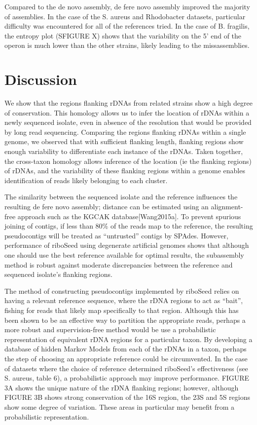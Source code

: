 \documentclass[11pt]{article}
\begin{document}
\begin{linenumbers}
Compared to the de novo assembly, de fere novo assembly improved the majority of assemblies. In the case of the S. aureus and Rhodobacter datasets, particular difficulty was encountered for all of the references tried. In the case of B. fragilis, the entropy plot (SFIGURE X) shows that the variability on the 5’ end of the operon is much lower than the other strains, likely leading to the missassemblies.


\section*{Discussion}
We show that the regions flanking rDNAs from related strains show a high degree of conservation. This homology allows us to infer the location of rDNAs within a newly sequenced isolate, even in absence of the resolution that would be provided by long read sequencing. Comparing the regions flanking rDNAs within a single genome, we observed that with sufficient flanking length, flanking regions show enough variability to differentiate each instance of the rDNAs. Taken together, the cross-taxon homology allows inference of the location (ie the flanking regions) of rDNAs, and the variability of these flanking regions within a genome enables identification of reads likely belonging to each cluster.


The similarity between the sequenced isolate and the reference influences the resulting de fere novo assembly; distance can be estimated using an alignment-free approach such as the KGCAK database[Wang2015a]. To prevent spurious joining of contigs, if less than 80\% of the reads map to the reference, the resulting pseudocontigs will be treated as “untrusted” contigs by SPAdes. However, performance of riboSeed using degenerate artificial genomes shows that although one should use the best reference available for optimal results, the subassembly method is robust against moderate discrepancies between the reference and sequenced isolate’s flanking regions.



The method of constructing pseudocontigs implemented by riboSeed relies on having a relevant reference sequence, where the rDNA regions to act as “bait”, fishing for reads that likely map specifically to that region. Although this has been shown to be an effective way to partition the appropriate reads, perhaps a more robust and supervision-free method would be use a probabilistic representation of equivalent rDNA regions for a particular taxon. By developing a database of hidden Markov Models from each of the rDNAs in a taxon, perhaps the step of choosing an appropriate reference could be circumvented. In the case of datasets where the choice of reference determined riboSeed’s effectiveness (see S. aureus, table 6), a probabilistic approach may improve performance. FIGURE 3A shows the unique nature of the rDNA flanking regions; however, although FIGURE 3B shows strong conservation of the 16S region, the 23S and 5S regions show some degree of variation.  These areas in particular may benefit from a probabilistic representation.



\end{linenumbers}
\end{document}
